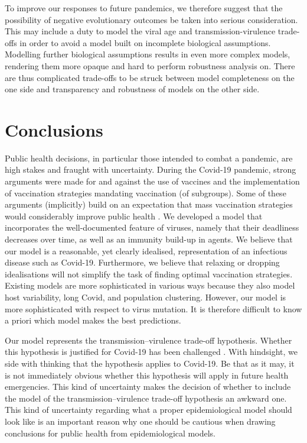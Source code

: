 \documentclass[a4paper,12pt]{article}
\begin{document}
To improve our responses to future pandemics, we therefore suggest that the possibility of negative evolutionary outcomes be taken into serious consideration. This may include a duty to model the viral age and transmission-virulence trade-offs in order to avoid a model built on incomplete biological assumptions. Modelling further biological assumptions results in even more complex models, rendering them more opaque and hard to perform robustness analysis on. There are thus complicated trade-offs to be struck between model completeness on the one side and transparency and robustness of models on the other side.

\section{Conclusions}\label{sec:Conclusions}
Public health decisions, in particular those intended to combat a pandemic, are high stakes and fraught with uncertainty. During the Covid-19 pandemic, strong arguments were made for and against the use of vaccines and the implementation of vaccination strategies mandating vaccination (of subgroups). Some of these arguments (implicitly) build on an expectation that mass vaccination strategies would considerably improve public health \cite[P.\ 3]{Rouzine2023}. We developed a model that incorporates the well-documented feature of viruses, namely that their deadliness decreases over time, as well as an immunity build-up in agents. We believe that our model is a reasonable, yet clearly idealised, representation of an infectious disease such as Covid-19. Furthermore, we believe that relaxing or dropping idealisations will not simplify the task of finding optimal vaccination strategies. Existing models are more sophisticated in various ways because they also model host variability, long Covid, and population clustering. However, our model is more sophisticated with respect to virus mutation. It is therefore difficult to know a priori which model makes the best predictions.

Our model represents the transmission–virulence trade-off hypothesis. Whether this hypothesis is justified for Covid-19 has been challenged \cite{Kun2023}. With hindsight, we side with \cite{Bruessow2022} thinking that the hypothesis applies to Covid-19. Be that as it may, it is not immediately obvious whether this hypothesis will apply in future health emergencies. This kind of uncertainty makes the decision of whether to include the model of the transmission–virulence trade-off hypothesis an awkward one. This kind of uncertainty regarding what a proper epidemiological model should look like is an important reason why one should be cautious when drawing conclusions for public health from epidemiological models.
\end{document}
